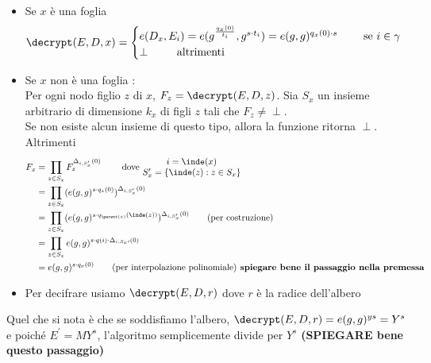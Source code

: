 \begin{itemize}
\begin{description}
\begin{itemize}
\item Se $x$ è una foglia
\[ \decrypt(E,D,x) = \begin{cases}
e(D_x,E_i) = e(g^{\frac{q_x(0)}{t_i}},g^{s\cdot t_i}) = e(g,g)^{q_x(0) \cdot s} \qquad \text{ se } i \in \gamma \\
\perp \qquad \text{ altrimenti}  
\end{cases} \]
\item Se $x$ non è una foglia :\\
Per ogni nodo figlio $z$ di $x$, $F_z = \decrypt(E,D,z)$. Sia $S_x$ un insieme arbitrario di dimensione $k_x$ di figli $z$ tali che $F_z \neq \perp$.\\
Se non esiste alcun insieme di questo tipo, allora la funzione ritorna $\perp$. Altrimenti
\begin{align*}
F_x &= \prod_{z \in S_x} F_z^{\Delta_{i,S_x^\prime}(0)} \qquad \text{ dove }
\begin{matrix}
i = \inde(x)\\
S^\prime_x = \{ \inde(z) : z \in S_x \}
\end{matrix}\\
&= \prod_{z \in S_x} (e(g,g)^{s \cdot q_z(0)})^{\Delta_{i,S_x^\prime}(0)}\\
&= \prod_{z \in S_x} (e(g,g)^{s \cdot q_{\parent(z)}(\inde(z))})^{\Delta_{i,S_x^\prime}(0)} \qquad \text{(per costruzione)}\\
&= \prod_{z \in S_x} e(g,g)^{s \cdot q(i) \cdot \Delta_{i,S_x\prime}(0)}\\
&= e(g,g)^{s \cdot q_x(0)} \qquad \text{(per interpolazione polinomiale)\textbf{ spiegare bene il passaggio nella premessa}}
\end{align*}
\item Per decifrare usiamo $\decrypt (E,D,r)$ dove $r$ è la radice dell'albero
\end{itemize}
Quel che si nota è che se soddisfiamo l'albero, $\decrypt (E,D,r) = e(g,g)^{ys} = Y^s$ e poiché $E^\prime = MY^s$, l'algoritmo semplicemente divide per $Y^s$ \textbf{(SPIEGARE bene questo passaggio)}
\end{description}
\end{itemize}

